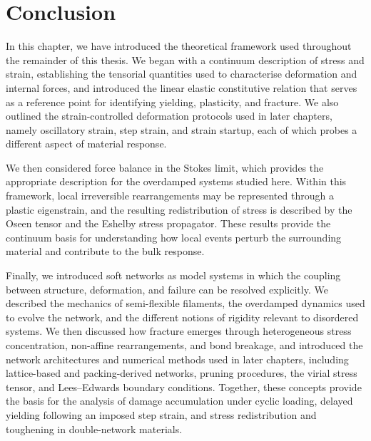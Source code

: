 \section{Conclusion}
    In this chapter, we have introduced the theoretical framework used throughout the remainder of this thesis. We began with a continuum description of stress and strain, establishing the tensorial quantities used to characterise deformation and internal forces, and introduced the linear elastic constitutive relation that serves as a reference point for identifying yielding, plasticity, and fracture. We also outlined the strain-controlled deformation protocols used in later chapters, namely oscillatory strain, step strain, and strain startup, each of which probes a different aspect of material response.
    
    We then considered force balance in the Stokes limit, which provides the appropriate description for the overdamped systems studied here. Within this framework, local irreversible rearrangements may be represented through a plastic eigenstrain, and the resulting redistribution of stress is described by the Oseen tensor and the Eshelby stress propagator. These results provide the continuum basis for understanding how local events perturb the surrounding material and contribute to the bulk response.
    
    Finally, we introduced soft networks as model systems in which the coupling between structure, deformation, and failure can be resolved explicitly. We described the mechanics of semi-flexible filaments, the overdamped dynamics used to evolve the network, and the different notions of rigidity relevant to disordered systems. We then discussed how fracture emerges through heterogeneous stress concentration, non-affine rearrangements, and bond breakage, and introduced the network architectures and numerical methods used in later chapters, including lattice-based and packing-derived networks, pruning procedures, the virial stress tensor, and Lees--Edwards boundary conditions. Together, these concepts provide the basis for the analysis of damage accumulation under cyclic loading, delayed yielding following an imposed step strain, and stress redistribution and toughening in double-network materials.

